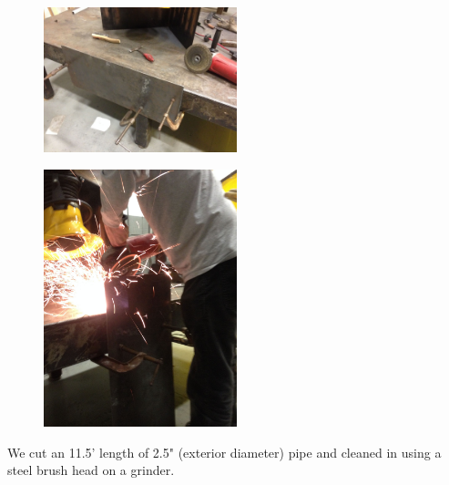 \documentclass[11pt]{article} %
\begin{document}





\begin{figure}
  \centering
  \caption{   }
  \includegraphics[width=0.50\textwidth]{roofmount/01.jpeg}
\end{figure}

\begin{figure}
  \centering
  \caption{   }
  \includegraphics[width=0.50\textwidth]{roofmount/02.jpeg}
\end{figure}


We cut an 11.5' length of 2.5" (exterior diameter) pipe and cleaned in using a steel brush head on a grinder.
\end{document}
